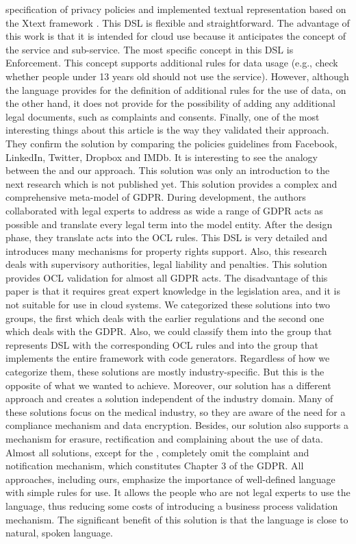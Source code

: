 \documentclass[11pt,english]{article}
\begin{document}
specification of privacy policies and implemented textual representation based on the Xtext framework \cite{bettini2016implementing}. This DSL is flexible and straightforward. The advantage of this work is that it is intended for cloud use because it anticipates the concept of the service and sub-service. The most specific concept in this DSL is Enforcement. This concept supports additional rules for data usage (e.g., check whether people under 13 years old should not use the service). However, although the language provides for the definition of additional rules for the use of data, on the other hand, it does not provide for the possibility of adding any additional legal documents, such as complaints and consents. Finally, one of the most interesting things about this article is the way they validated their approach. They confirm the solution by comparing the policies guidelines from Facebook, LinkedIn, Twitter, Dropbox and IMDb. \newline It is interesting to see the analogy between the \cite{torre2019using} and our approach. This solution was only an introduction to the next research  \cite{modeldrivengdpr} which is not published yet. This solution provides a complex and comprehensive meta-model of GDPR. During development, the authors collaborated with legal experts to address as wide a range of GDPR acts as possible and translate every legal term into the model entity. After the design phase, they translate acts into the OCL rules. This DSL is very detailed and introduces many mechanisms for property rights support. Also, this research deals with supervisory authorities, legal liability and penalties. This solution provides OCL validation for almost all GDPR acts. The disadvantage of this paper is that it requires great expert knowledge in the legislation area, and it is not suitable for use in cloud systems. \newline We categorized these solutions into two groups, the first which deals with the earlier regulations and the second one which deals with the GDPR. Also, we could classify them into the group that represents DSL with the corresponding OCL rules and into the group that implements the entire framework with code generators. Regardless of how we categorize them, these solutions are mostly industry-specific. But this is the opposite of what we wanted to achieve. Moreover, our solution has a different approach and creates a solution independent of the industry domain. Many of these solutions focus on the medical industry, so they are aware of the need for a compliance mechanism and data encryption. Besides, our solution also supports a mechanism for erasure, rectification and complaining about the use of data. Almost all solutions, except for the \cite{torre2019using}, completely omit the complaint and notification mechanism, which constitutes Chapter 3 of the GDPR. All approaches, including ours, emphasize the importance of well-defined language with simple rules for use. It allows the people who are not legal experts to use the language, thus reducing some costs of introducing a business process validation mechanism. The significant benefit of this solution is that the language is close to natural, spoken language.
\end{document}

